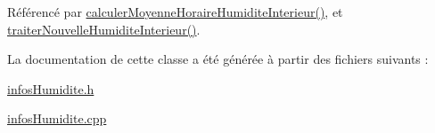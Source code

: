 Référencé par \hyperlink{class_infos_humidite_acd903311f6c949f8f010b330f517e4f3}{calculer\+Moyenne\+Horaire\+Humidite\+Interieur()}, et \hyperlink{class_infos_humidite_a0995d68a036f73df3b5a86e5538104bd}{traiter\+Nouvelle\+Humidite\+Interieur()}.



La documentation de cette classe a été générée à partir des fichiers suivants \+:\begin{DoxyCompactItemize}
\item 
\hyperlink{infos_humidite_8h}{infos\+Humidite.\+h}\item 
\hyperlink{infos_humidite_8cpp}{infos\+Humidite.\+cpp}\end{DoxyCompactItemize}
